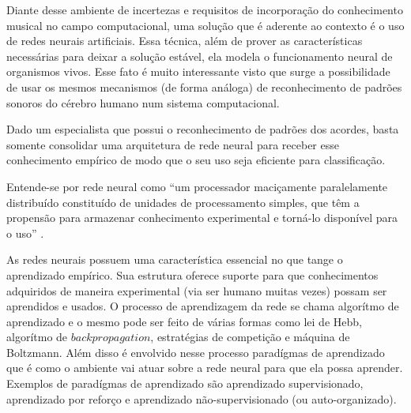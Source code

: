 Diante desse ambiente de incertezas e requisitos de incorporação do conhecimento musical no campo computacional, uma solução que é aderente ao contexto é o uso de redes neurais artificiais. Essa técnica, além de prover as características necessárias para deixar a solução estável, ela modela o funcionamento neural de organismos vivos. Esse fato é muito interessante visto que surge a possibilidade de usar os mesmos mecanismos (de forma análoga) de reconhecimento de padrões sonoros do cérebro humano num sistema computacional.

Dado um especialista que possui o reconhecimento de padrões dos acordes, basta somente consolidar uma arquitetura de rede neural para receber esse conhecimento empírico de modo que o seu uso seja eficiente para classificação.

Entende-se por rede neural como ``um processador maciçamente paralelamente distribuído constituído de unidades de processamento simples, que têm a propensão para armazenar conhecimento experimental e torná-lo disponível para o uso'' \cite{haykin2009neural}.

As redes neurais possuem uma característica essencial no que tange o aprendizado empírico. Sua estrutura oferece suporte para que conhecimentos adquiridos de maneira experimental (via ser humano muitas vezes) possam ser aprendidos e usados. O processo de aprendizagem da rede se chama algorítmo de aprendizado e o mesmo pode ser feito de várias formas como lei de Hebb, algorítmo de $backpropagation$, estratégias de competição e máquina de Boltzmann. Além disso é envolvido nesse processo paradígmas de aprendizado que é como o ambiente vai atuar sobre a rede neural para que ela possa aprender. Exemplos de paradígmas de aprendizado são aprendizado supervisionado, aprendizado por reforço e aprendizado não-supervisionado (ou auto-organizado).

